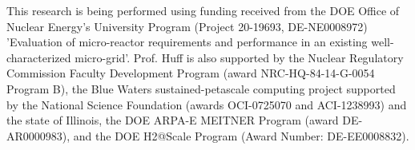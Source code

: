 \documentclass{anstrans}
\begin{document}
This research is being performed using funding received from the DOE Office of Nuclear Energy's University Program (Project 20-19693, DE-NE0008972) 'Evaluation of micro-reactor requirements and performance in an existing well-characterized micro-grid'.
Prof. Huff is also supported by the Nuclear Regulatory Commission Faculty Development Program (award NRC-HQ-84-14-G-0054 Program B), the Blue Waters sustained-petascale computing project supported by the National Science Foundation (awards OCI-0725070 and ACI-1238993) and the state of Illinois, the DOE ARPA-E MEITNER Program (award DE-AR0000983), and the DOE H2@Scale Program (Award Number: DE-EE0008832).



\end{document}
